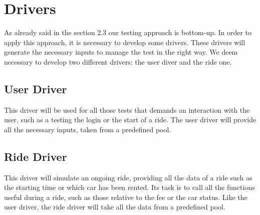 \section{Drivers}
As already said in the section 2.3 our testing approach is bottom-up. In order to apply this approach, it is necessary to develop some drivers. These drivers will generate the necessary inputs to manage the test in the right way. We deem necessary to develop two different drivers: the user diver and the ride one.
\subsection{User Driver}
This driver will be used for all those tests that demands an interaction with the user, such as a testing the login or the start of a ride. The user driver will provide all the necessary inputs, taken from a predefined pool.
\subsection{Ride Driver}
This driver will simulate an ongoing ride, providing all the data of a ride such as the starting time or which car has been rented. Its task is to call all the functions useful during a ride, such as those relative to the fee or the car status. Like the user driver, the ride driver will take all the data from a predefined pool.